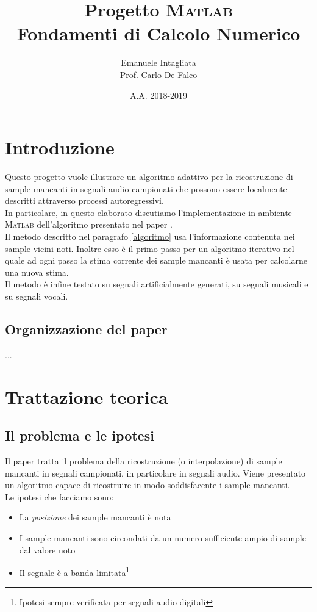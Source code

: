 \documentclass{article}
\title{Progetto \textsc{Matlab}\\Fondamenti di Calcolo Numerico}
\date{A.A. 2018-2019}
\author{Emanuele Intagliata\\Prof. Carlo De Falco}
\begin{document}
	\maketitle

	\newpage
	
	\tableofcontents

	\newpage
	\section{Introduzione}
Questo progetto vuole illustrare un algoritmo adattivo per la ricostruzione di sample mancanti in segnali audio campionati che possono essere localmente descritti attraverso processi autoregressivi.
\\
In particolare, in questo elaborato discutiamo l'implementazione in ambiente \textsc{Matlab} dell'algoritmo presentato nel paper \cite{paper_1986}.
\medskip
\\
Il metodo descritto nel paragrafo \ref{algoritmo} usa l'informazione contenuta nei sample vicini noti. Inoltre esso è il primo passo per un algoritmo iterativo nel quale ad ogni passo la stima corrente dei sample mancanti è usata per calcolarne una nuova stima. 
\\
Il metodo è infine testato su segnali artificialmente generati, su segnali musicali e su segnali vocali.

	\subsection{Organizzazione del paper}
	
	...

\newpage
	\section{Trattazione teorica}
	
	\subsection{Il problema e le ipotesi} \label{hp}
Il paper \cite{paper_1986} tratta il problema della ricostruzione (o interpolazione) di sample mancanti in segnali campionati, in particolare in segnali audio. Viene presentato un algoritmo capace di ricostruire in modo soddisfacente i sample mancanti.
\\
Le ipotesi che facciamo sono:

\begin{itemize}
\item La \emph{posizione} dei sample mancanti è nota
\item I sample mancanti sono circondati da un numero sufficiente ampio di sample dal valore noto
\item Il segnale è a banda limitata\footnote{Ipotesi sempre verificata per segnali audio digitali}
\end{itemize}
\end{document}
